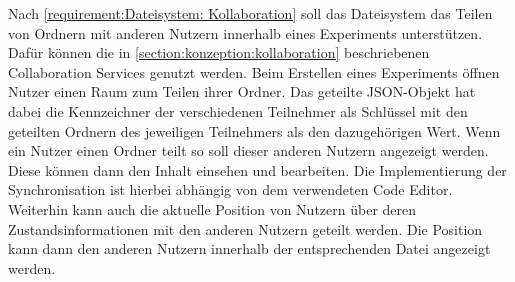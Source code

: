 Nach \autoref{requirement:Dateisystem: Kollaboration} soll das Dateisystem das Teilen von Ordnern mit anderen Nutzern innerhalb eines Experiments unterstützen. Dafür können die in \autoref{section:konzeption:kollaboration} beschriebenen Collaboration Services genutzt werden. Beim Erstellen eines Experiments öffnen Nutzer einen Raum zum Teilen ihrer Ordner. Das geteilte JSON-Objekt hat dabei die Kennzeichner der verschiedenen Teilnehmer als Schlüssel mit den geteilten Ordnern des jeweiligen Teilnehmers als den dazugehörigen Wert. Wenn ein Nutzer einen Ordner teilt so soll dieser anderen Nutzern angezeigt werden. Diese können dann den Inhalt einsehen und bearbeiten. Die Implementierung der Synchronisation ist hierbei abhängig von dem verwendeten Code Editor. Weiterhin kann auch die aktuelle Position von Nutzern über deren Zustandsinformationen mit den anderen Nutzern geteilt werden. Die Position kann dann den anderen Nutzern innerhalb der entsprechenden Datei angezeigt werden.
